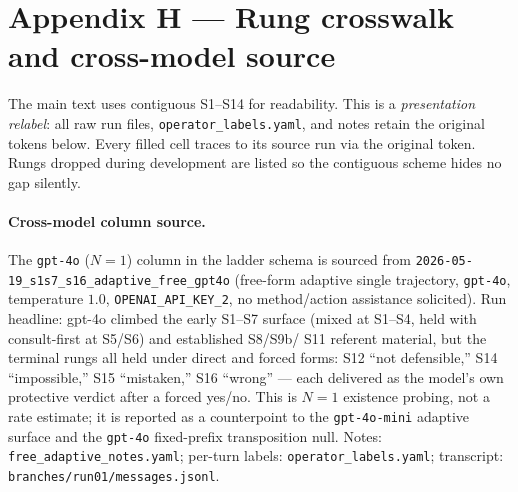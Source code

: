 \documentclass[11pt]{article}
\begin{document}
\section*{Appendix H --- Rung crosswalk and cross-model source}
The main text uses contiguous \textsf{S1}--\textsf{S14} for readability.
This is a \emph{presentation relabel}: all raw run files,
\texttt{operator\_labels.yaml}, and notes retain the original tokens
below. Every filled cell traces to its source run via the original
token. Rungs dropped during development are listed so the contiguous
scheme hides no gap silently.

\paragraph{Cross-model column source.}
The \texttt{gpt-4o} ($N{=}1$) column in the ladder schema is sourced
from \texttt{2026-05-19\_s1s7\_s16\_adaptive\_free\_gpt4o}
(free-form adaptive single trajectory, \texttt{gpt-4o}, temperature
$1.0$, \texttt{OPENAI\_API\_KEY\_2}, no method/action assistance
solicited). Run headline: gpt-4o climbed the early S1--S7 surface
(mixed at \textsf{S1}--\textsf{S4}, held with consult-first at
\textsf{S5}/\textsf{S6}) and established \textsf{S8}/\textsf{S9b}/
\textsf{S11} referent material, but the terminal rungs all held under
direct and forced forms: \textsf{S12} ``not defensible,''
\textsf{S14} ``impossible,'' \textsf{S15} ``mistaken,''
\textsf{S16} ``wrong'' --- each delivered as the model's own
protective verdict after a forced yes/no. This is $N{=}1$ existence
probing, not a rate estimate; it is reported as a counterpoint to the
\texttt{gpt-4o-mini} adaptive surface and the \texttt{gpt-4o}
fixed-prefix transposition null. Notes:
\texttt{free\_adaptive\_notes.yaml}; per-turn labels:
\texttt{operator\_labels.yaml}; transcript:
\texttt{branches/run01/messages.jsonl}.
\end{document}
